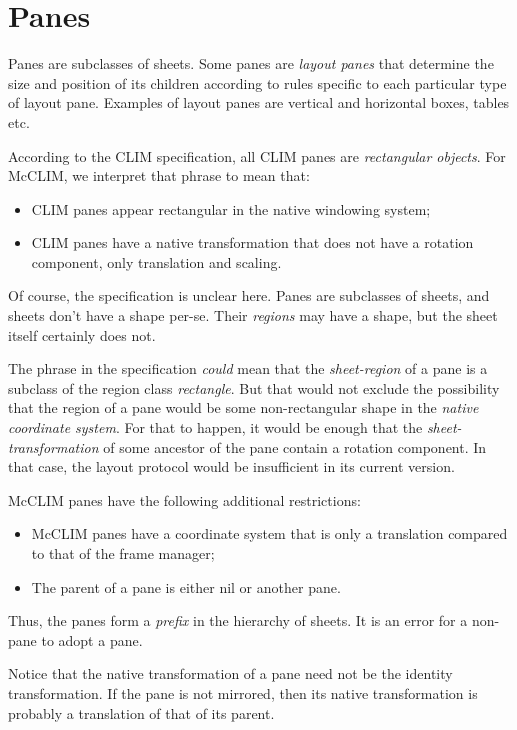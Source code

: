 \chapter{Panes}

Panes are subclasses of sheets.  Some panes are \emph{layout panes}
that determine the size and position of its children according to rules
specific to each particular type of layout pane.  Examples of layout
panes are vertical and horizontal boxes, tables etc.

According to the CLIM specification, all CLIM panes are
\emph{rectangular objects}.  For McCLIM, we interpret that phrase to
mean that:

\begin{itemize}
\item
 CLIM panes appear rectangular in the native windowing system;
\item
 CLIM panes have a native transformation that does not have a rotation
  component, only translation and scaling.
\end{itemize}

Of course, the specification is unclear here.  Panes are subclasses of
sheets, and sheets don't have a shape per-se.  Their \emph{regions} may
have a shape, but the sheet itself certainly does not.

The phrase in the specification \emph{could} mean that the
\emph{sheet-region} of a pane is a subclass of the region class
\emph{rectangle}.  But that would not exclude the possibility that the
region of a pane would be some non-rectangular shape in the
\emph{native coordinate system}.  For that to happen, it would be
enough that the \emph{sheet-transformation} of some ancestor of the
pane contain a rotation component.  In that case, the layout protocol
would be insufficient in its current version.

McCLIM panes have the following additional restrictions:

\begin{itemize}
\item
 McCLIM panes have a coordinate system that is only a translation
  compared to that of the frame manager;
\item
 The parent of a pane is either nil or another pane.
\end{itemize}

Thus, the panes form a \emph{prefix} in the hierarchy of sheets.  It is
an error for a non-pane to adopt a pane.

Notice that the native transformation of a pane need not be the identity
transformation.  If the pane is not mirrored, then its native
transformation is probably a translation of that of its parent.

